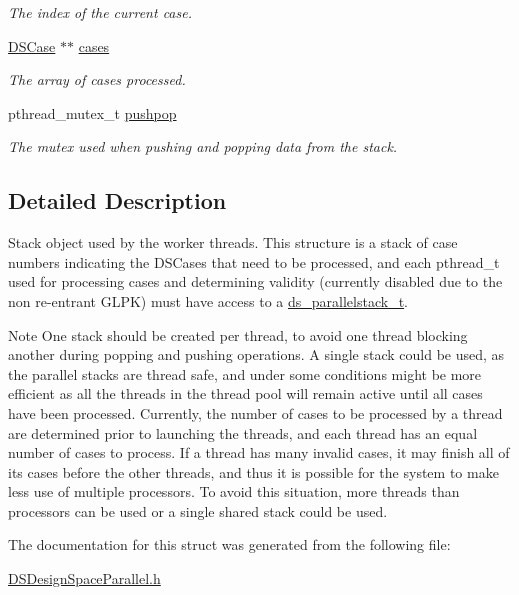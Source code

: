 \begin{DoxyCompactItemize}
\begin{DoxyCompactList}\small\item\em The index of the current case. \item\end{DoxyCompactList}\item 
\hypertarget{structds__parallelstack__t_afa7b439dc6ec7721726441e704fe6493}{
\hyperlink{struct_d_s_case}{DSCase} $\ast$$\ast$ \hyperlink{structds__parallelstack__t_afa7b439dc6ec7721726441e704fe6493}{cases}}
\label{structds__parallelstack__t_afa7b439dc6ec7721726441e704fe6493}

\begin{DoxyCompactList}\small\item\em The array of cases processed. \item\end{DoxyCompactList}\item 
\hypertarget{structds__parallelstack__t_a7710776f2028c036203f5b6f77686749}{
pthread\_\-mutex\_\-t \hyperlink{structds__parallelstack__t_a7710776f2028c036203f5b6f77686749}{pushpop}}
\label{structds__parallelstack__t_a7710776f2028c036203f5b6f77686749}

\begin{DoxyCompactList}\small\item\em The mutex used when pushing and popping data from the stack. \item\end{DoxyCompactList}\end{DoxyCompactItemize}


\subsection{Detailed Description}
Stack object used by the worker threads. This structure is a stack of case numbers indicating the DSCases that need to be processed, and each pthread\_\-t used for processing cases and determining validity (currently disabled due to the non re-\/entrant GLPK) must have access to a \hyperlink{structds__parallelstack__t}{ds\_\-parallelstack\_\-t}.

\begin{DoxyNote}{Note}
One stack should be created per thread, to avoid one thread blocking another during popping and pushing operations. A single stack could be used, as the parallel stacks are thread safe, and under some conditions might be more efficient as all the threads in the thread pool will remain active until all cases have been processed. Currently, the number of cases to be processed by a thread are determined prior to launching the threads, and each thread has an equal number of cases to process. If a thread has many invalid cases, it may finish all of its cases before the other threads, and thus it is possible for the system to make less use of multiple processors. To avoid this situation, more threads than processors can be used or a single shared stack could be used. 
\end{DoxyNote}


The documentation for this struct was generated from the following file:\begin{DoxyCompactItemize}
\item 
\hyperlink{_d_s_design_space_parallel_8h}{DSDesignSpaceParallel.h}\end{DoxyCompactItemize}
